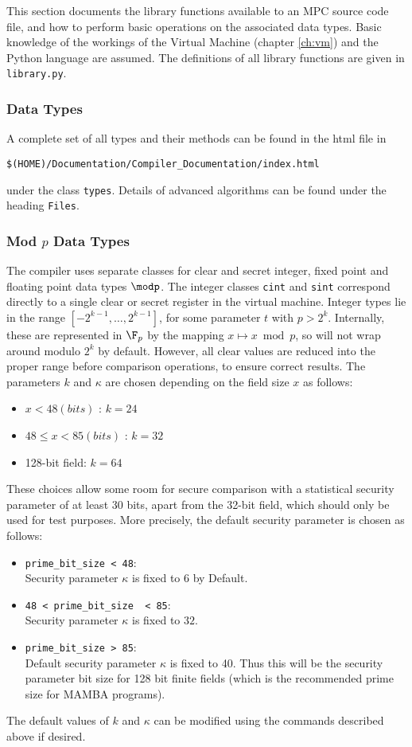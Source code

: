 This section documents the library functions available to an MPC source code
file, and how to perform basic operations on the associated data types.
Basic knowledge of the workings of the Virtual Machine
(chapter \ref{ch:vm}) and the Python language are assumed. The definitions
of all library functions are given in \verb|library.py|.

\subsubsection{Data Types}
\label{ref:datatypes}

A complete set of all types and their methods can be found in
the html file in
\begin{center}
   \verb+$(HOME)/Documentation/Compiler_Documentation/index.html+
\end{center}
under the class \verb+types+.
Details of advanced algorithms can be found under the heading
\verb+Files+.
\subsubsection{Mod $p$ Data Types}
The compiler uses separate classes for clear and secret integer, fixed point
and floating point data types $\modp$. The integer classes \verb|cint| and \verb|sint|
correspond directly to a single clear or secret register in the virtual machine.
Integer types lie in the range $[-2^{k-1}, \dots, 2^{k-1}]$, for some
parameter $t$ with $p > 2^k$. Internally, these are represented in $\F_p$ by the
mapping $x \mapsto x \bmod{p}$, so will not wrap around modulo $2^k$ by default.
However, all clear values are reduced into the proper
range before comparison operations, to ensure correct results.
The parameters $k$ and $\kappa$ are chosen depending on the field size $x$ as follows:
\begin{itemize}
\item $x < 48 (bits)$ : $k = 24$
\item $48 \le x < 85 (bits)$ : $k = 32$
\item 128-bit field: $k = 64$
\end{itemize}
These choices allow some room for secure comparison with a statistical
security parameter of at least 30 bits, apart from the 32-bit field, which
should only be used for test purposes. More precisely, the default security parameter is chosen as follows:
\begin{itemize}
\item \verb|prime_bit_size < 48|:\\ 
Security parameter $\kappa$ is fixed to $6$ by Default.
\item \verb|48 < prime_bit_size  < 85|: \\
Security parameter $\kappa$ is fixed to $32$. 
\item \verb|prime_bit_size > 85|:\\
Default security parameter $\kappa$ is fixed to 40. Thus this will be the security parameter bit size for 128 bit finite
fields (which is the recommended prime size for MAMBA programs).
\end{itemize} 
The default values of $k$ and $\kappa$ can be modified using the commands described above if desired.

